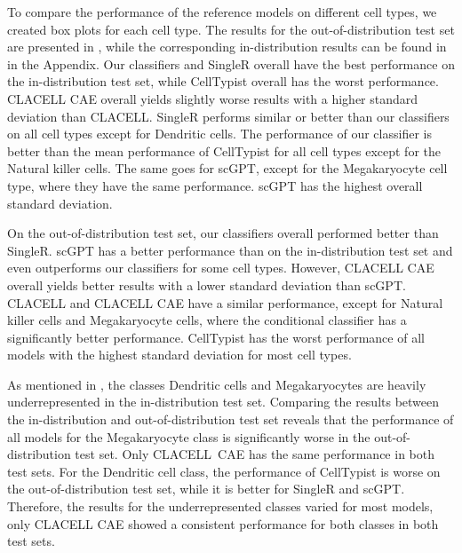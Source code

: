 \documentclass[11pt]{article}
\begin{document}
To compare the performance of the reference models on different cell types, we created box plots for each cell type. 
The results for the out-of-distribution test set are presented in , while the corresponding in-distribution results can be found in  in the Appendix.
Our classifiers and SingleR overall have the best performance on the in-distribution test set, while CellTypist overall has the worst performance. CLACELL CAE overall yields slightly worse results with a higher standard deviation than CLACELL. SingleR performs similar or better than our classifiers on all cell types except for Dendritic cells. The performance of our classifier is better than the mean performance of CellTypist for all cell types except for the Natural killer cells. The same goes for scGPT, except for the Megakaryocyte cell type, where they have the same performance. scGPT has the highest overall standard deviation.

On the out-of-distribution test set, our classifiers overall performed better than SingleR. scGPT has a better performance than on the in-distribution test set and even outperforms our classifiers for some cell types. However, CLACELL CAE overall yields better results with a lower standard deviation than scGPT. CLACELL and CLACELL CAE have a similar performance, except for Natural killer cells and Megakaryocyte cells, where the conditional classifier has a significantly better performance. CellTypist has the worst performance of all models with the highest standard deviation for most cell types.

As mentioned in , the classes Dendritic cells and Megakaryocytes are heavily underrepresented in the in-distribution test set. Comparing the results between the in-distribution and out-of-distribution test set reveals that the performance of all models for the Megakaryocyte class is significantly worse in the out-of-distribution test set. Only CLACELL~CAE has the same performance in both test sets. For the Dendritic cell class, the performance of CellTypist is worse on the out-of-distribution test set, while it is better for SingleR and scGPT. Therefore, the results for the underrepresented classes varied for most models, only CLACELL CAE showed a consistent performance for both classes in both test sets.
\end{document}
